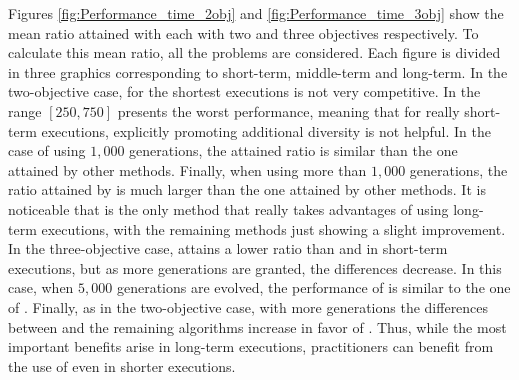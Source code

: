 Figures \ref{fig:Performance_time_2obj} and \ref{fig:Performance_time_3obj} show the mean \HV{} ratio attained with each \MOEA{} with two and three objectives respectively.
%
To calculate this mean ratio, all the problems are considered.
%
Each figure is divided in three graphics corresponding to short-term, middle-term and long-term.
%
In the two-objective case, for the shortest executions \VSDMOEA{} is not very competitive.
%
In the range $[250, 750]$ presents the worst performance, meaning that for really short-term executions,
explicitly promoting additional diversity is not helpful.
%
In the case of using $1,000$ generations, the attained \HV{} ratio is similar than the one attained by other methods.
%
Finally, when using more than $1,000$ generations, the \HV{} ratio attained by \VSDMOEA{} is much larger than the one
attained by other methods.
%
It is noticeable that \VSDMOEA{} is the only method that really takes advantages of using long-term executions,
with the remaining methods just showing a slight improvement.
%
In the three-objective case, \VSDMOEA{} attains a lower \HV{} ratio than \RMOEA{} and \MOEAD{} in short-term executions,
but as more generations are granted, the differences decrease.
%
In this case, when $5,000$ generations are evolved, the performance of \VSDMOEA{} is similar to the one of \RMOEA{}.
%
Finally, as in the two-objective case, with more generations the differences between \VSDMOEA{} and the remaining
algorithms increase in favor of \VSDMOEA{}.
%
Thus, while the most important benefits arise in long-term executions, practitioners can benefit from the use
of \VSDMOEA{} even in shorter executions.


